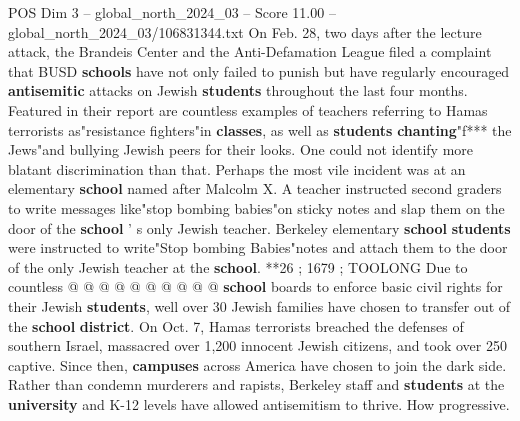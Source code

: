 \begin{textsample}{POS Dim 3 – global\_north\_2024\_03 – Score 11.00 – global\_north\_2024\_03/106831344.txt}
On Feb. 28, two days after the lecture attack, the Brandeis Center and the Anti-Defamation League filed a complaint that BUSD \textbf{schools} have not only failed to punish but have regularly encouraged \textbf{antisemitic} attacks on Jewish \textbf{students} throughout the last four months.
Featured in their report are countless examples of teachers referring to Hamas terrorists as"resistance fighters"in \textbf{classes}, as well as \textbf{students} \textbf{chanting}"f*** the Jews"and bullying Jewish peers for their looks.
One could not identify more blatant discrimination than that.
Perhaps the most vile incident was at an elementary \textbf{school} named after Malcolm X.
A teacher instructed second graders to write messages like"stop bombing babies"on sticky notes and slap them on the door of the \textbf{school} ' s only Jewish teacher.
Berkeley elementary \textbf{school} \textbf{students} were instructed to write"Stop bombing Babies"notes and attach them to the door of the only Jewish teacher at the \textbf{school}. **26 ; 1679 ; TOOLONG Due to countless @ @ @ @ @ @ @ @ @ @ \textbf{school} boards to enforce basic civil rights for their Jewish \textbf{students}, well over 30 Jewish families have chosen to transfer out of the \textbf{school} \textbf{district}.
On Oct. 7, Hamas terrorists breached the defenses of southern Israel, massacred over 1,200 innocent Jewish citizens, and took over 250 captive.
Since then, \textbf{campuses} across America have chosen to join the dark side.
Rather than condemn murderers and rapists, Berkeley staff and \textbf{students} at the \textbf{university} and K-12 levels have allowed antisemitism to thrive.
How progressive.

\end{textsample}
